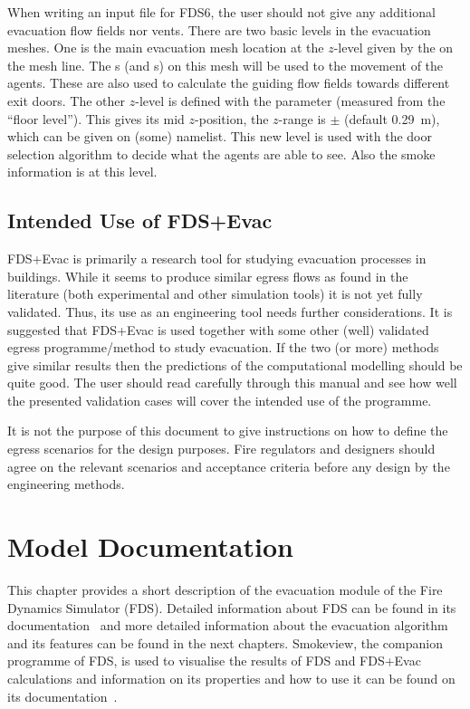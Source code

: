 \documentclass[12pt,a4paper,final,twoside]{stylevk}
\begin{document}
When writing an input file for FDS6, the user should not give
any additional evacuation flow fields nor vents.  There are two basic
levels in the evacuation meshes.  One is the main evacuation mesh
location at the $z$-level given by the  on the mesh line.
The s (and s) on this mesh will be used to the
movement of the agents.  These are also used to calculate the guiding
flow fields towards different exit doors.  The other $z$-level is
defined with the  parameter (measured from
the ``floor level'').  This gives its mid $z$-position, the $z$-range
is $\pm$ (default 0.29~m), which can be given
on (some)  namelist.  This new level is used with the door
selection algorithm to decide what the agents are able to see.  Also
the smoke information is at this level.


\section{Intended Use of FDS+Evac}\label{Sec_IntUsers}


\noindent FDS+Evac is primarily a research tool for studying
evacuation processes in buildings.  While it seems to produce similar
egress flows as found in the literature (both experimental and other
simulation tools) it is not yet fully validated.  Thus, its use as an
engineering tool needs further considerations.  It is suggested that
FDS+Evac is used together with some other (well) validated egress
programme/method to study evacuation.  If the two (or more) methods
give similar results then the predictions of the computational
modelling should be quite good.  The user should read carefully
through this manual and see how well the presented validation cases
will cover the intended use of the programme.

It is not the purpose of this document to give instructions on how to
define the egress scenarios for the design purposes.  Fire regulators
and designers should agree on the relevant scenarios and acceptance
criteria before any design by the engineering methods.

\clearpage

\newpage


\chapter{Model Documentation}\label{Sec_ModelDef}

\noindent This chapter provides a short description of the evacuation
module of the Fire Dynamics Simulator (FDS).  Detailed information
about FDS can be found in its documentation~\cite{FDS_Manual,
  FDS_UserGuide, FDS_VVGuide1, FDS_VVGuide2} and more detailed
information about the evacuation algorithm and its features can be
found in the next chapters.  Smokeview, the companion programme of
FDS, is used to visualise the results of FDS and FDS+Evac calculations
and information on its properties and how to use it can be found on
its documentation~\cite{SV_UserGuide, SV_TechGuide, SV_VVGuide}.
\end{document}
